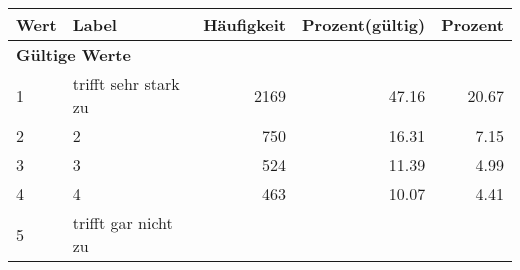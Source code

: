      \begin{longtable}{lXrrr}
     \toprule
     \textbf{Wert} & \textbf{Label} & \textbf{Häufigkeit} & \textbf{Prozent(gültig)} & \textbf{Prozent} \\
     \endhead
     \midrule
     \multicolumn{5}{l}{\textbf{Gültige Werte}}\\

     1 &
     \multicolumn{1}{X}{ trifft sehr stark zu   } &


       \num{2169} &
       \num[round-mode=places,round-precision=2]{47,16} &
         \num[round-mode=places,round-precision=2]{20,67} \\

     2 &
     \multicolumn{1}{X}{ 2   } &


       \num{750} &
       \num[round-mode=places,round-precision=2]{16,31} &
         \num[round-mode=places,round-precision=2]{7,15} \\

     3 &
     \multicolumn{1}{X}{ 3   } &


       \num{524} &
       \num[round-mode=places,round-precision=2]{11,39} &
         \num[round-mode=places,round-precision=2]{4,99} \\

     4 &
     \multicolumn{1}{X}{ 4   } &


       \num{463} &
       \num[round-mode=places,round-precision=2]{10,07} &
         \num[round-mode=places,round-precision=2]{4,41} \\

     5 &
     \multicolumn{1}{X}{ trifft gar nicht zu   } &



\end{longtable}
